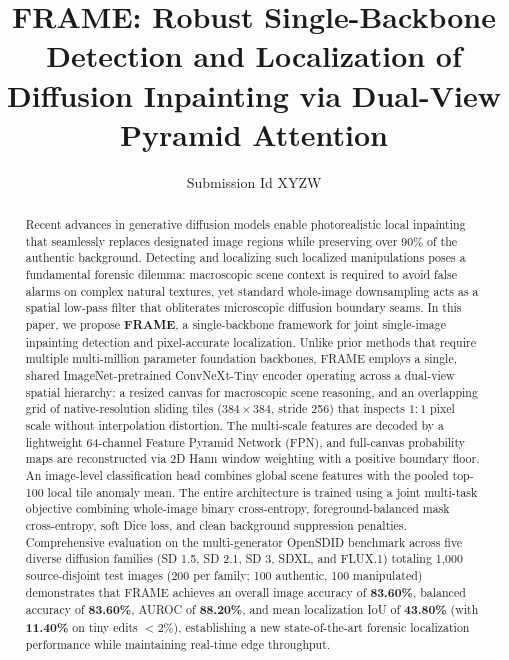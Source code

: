 \documentclass[sigconf,review=true]{acmart}
\begin{document}
\title{FRAME: Robust Single-Backbone Detection and Localization of Diffusion Inpainting via Dual-View Pyramid Attention}

\author{Submission Id XYZW}
\renewcommand{\shortauthors}{Submission Id XYZW}

\begin{abstract}
Recent advances in generative diffusion models enable photorealistic local inpainting that seamlessly replaces designated image regions while preserving over $90\%$ of the authentic background. Detecting and localizing such localized manipulations poses a fundamental forensic dilemma: macroscopic scene context is required to avoid false alarms on complex natural textures, yet standard whole-image downsampling acts as a spatial low-pass filter that obliterates microscopic diffusion boundary seams. In this paper, we propose \textbf{FRAME}, a single-backbone framework for joint single-image inpainting detection and pixel-accurate localization. Unlike prior methods that require multiple multi-million parameter foundation backbones, FRAME employs a single, shared ImageNet-pretrained ConvNeXt-Tiny encoder operating across a dual-view spatial hierarchy: a resized canvas for macroscopic scene reasoning, and an overlapping grid of native-resolution sliding tiles ($384 \times 384$, stride 256) that inspects $1:1$ pixel scale without interpolation distortion. The multi-scale features are decoded by a lightweight 64-channel Feature Pyramid Network (FPN), and full-canvas probability maps are reconstructed via 2D Hann window weighting with a positive boundary floor. An image-level classification head combines global scene features with the pooled top-100 local tile anomaly mean. The entire architecture is trained using a joint multi-task objective combining whole-image binary cross-entropy, foreground-balanced mask cross-entropy, soft Dice loss, and clean background suppression penalties. Comprehensive evaluation on the multi-generator OpenSDID benchmark across five diverse diffusion families (SD 1.5, SD 2.1, SD 3, SDXL, and FLUX.1) totaling 1,000 source-disjoint test images (200 per family; 100 authentic, 100 manipulated) demonstrates that FRAME achieves an overall image accuracy of \textbf{83.60\%}, balanced accuracy of \textbf{83.60\%}, AUROC of \textbf{88.20\%}, and mean localization IoU of \textbf{43.80\%} (with \textbf{11.40\%} on tiny edits $<2\%$), establishing a new state-of-the-art forensic localization performance while maintaining real-time edge throughput.
\end{abstract}
\end{document}
